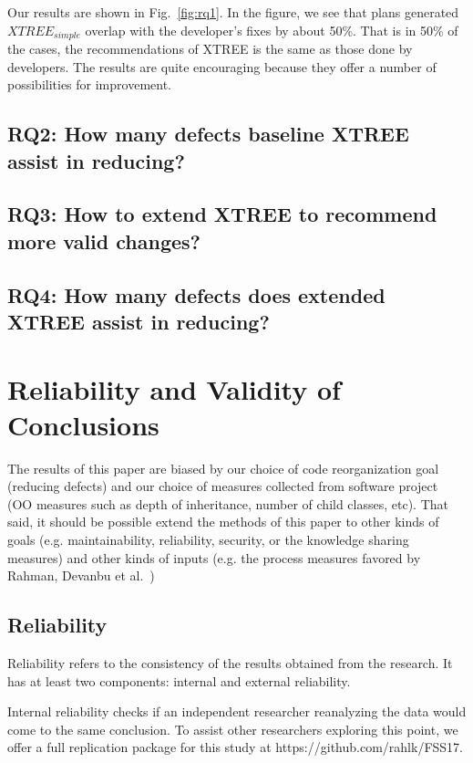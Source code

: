 \documentclass[sigconf, proceedings, 9pt]{acmart}
\newcommand{\fig}[1]{Fig.~\ref{fig:#1}}
\begin{document}
Our results are shown in \fig{rq1}. In the figure, we see that plans generated 
$XTREE_{simple}$ overlap with the developer's fixes by about 50\%. That is in 
50\% of the cases, the recommendations of XTREE is the same as those done by 
developers. The results are quite encouraging because they offer a number of 
possibilities for improvement.

\subsection*{\textbf{RQ2: How many defects baseline XTREE assist in 
reducing?}}
\subsection*{\textbf{RQ3: How to extend XTREE to recommend more valid 
changes?}} 
\subsection*{\textbf{RQ4: How many defects does extended XTREE assist 
in reducing?}} 

\section{Reliability and Validity of Conclusions}
\label{sect:valid}



The results of this paper are biased by our choice of code reorganization
goal (reducing defects) and our choice of measures collected from software
project (OO measures such as depth of inheritance, number of child classes,
etc). That said, it should be possible extend the methods of this paper to 
other
kinds of goals (e.g. maintainability, reliability, security, or the 
knowledge sharing
measures) and other kinds of
inputs (e.g. the process measures favored by Rahman,
Devanbu et al.~\cite{Rahman2013})

\subsection{Reliability}
Reliability refers to the consistency of the results obtained
from the research. It has at least two components: internal
and external reliability.

Internal reliability checks if an independent researcher
reanalyzing the data would come to the same conclusion.
To assist other researchers exploring this point, we offer a full 
replication package for this study at
https://github.com/rahlk/FSS17.
\end{document}
